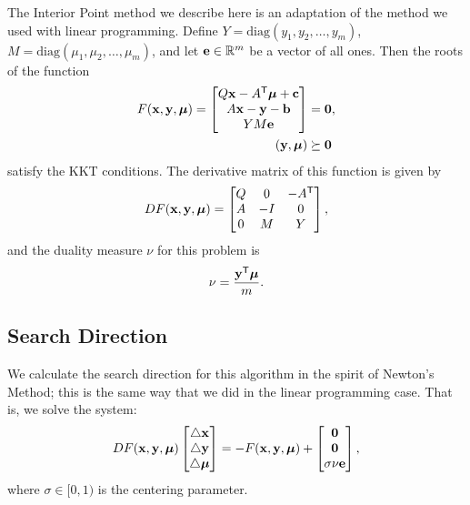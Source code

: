The Interior Point method we describe here is an adaptation of the method we used with linear programming.
Define $Y = \text{diag}(y_1,y_2,\ldots,y_m)$, $M = \text{diag}(\mu_1,\mu_2,\ldots,\mu_m)$, and let $\mathbf{e}\in\mathbb{R}^m$ be a vector of all ones.
Then the roots of the function
\begin{align*}
F(\mathbf{x},\mathbf{y},\boldsymbol{\mu}) =
\begin{bmatrix}
Q\mathbf{x}-A^{\mathsf T} \boldsymbol{\mu} + \mathbf{c}\\
A\mathbf{x}-\mathbf{y}-\mathbf{b}\\
YM\mathbf{e}
\end{bmatrix}
&= \mathbf{0},\\
(\mathbf{y},\boldsymbol{\mu}) &\succeq \mathbf{0}
\end{align*}
satisfy the KKT conditions.
The derivative matrix of this function is given by
\[
DF(\mathbf{x},\mathbf{y},\boldsymbol{\mu}) =
\begin{bmatrix}
Q & 0 & -A^{\mathsf T} \\
A & -I & 0\\
0 & M & Y
\end{bmatrix},
\]
and the duality measure $\nu$ for this problem is \[\nu = \frac{\mathbf{y}^{\mathsf T} \boldsymbol{\mu}}{m}.\]

\subsection*{Search Direction}

We calculate the search direction for this algorithm in the spirit of Newton's Method; this is the same way that we did in the linear programming case.
That is, we solve the system:
\begin{align}
DF(\mathbf{x},\mathbf{y},\boldsymbol{\mu})
\begin{bmatrix}\triangle \mathbf{x}\\ \triangle \mathbf{y}\\ \triangle \boldsymbol{\mu}\end{bmatrix}
= - F(\mathbf{x},\mathbf{y},\boldsymbol{\mu}) +
\begin{bmatrix} \mathbf{0} \\ \mathbf{0} \\ \sigma\nu\mathbf{e} \end{bmatrix},
\label{eq:searchDirection}
\end{align}
where $\sigma\in [0,1)$ is the centering parameter.


